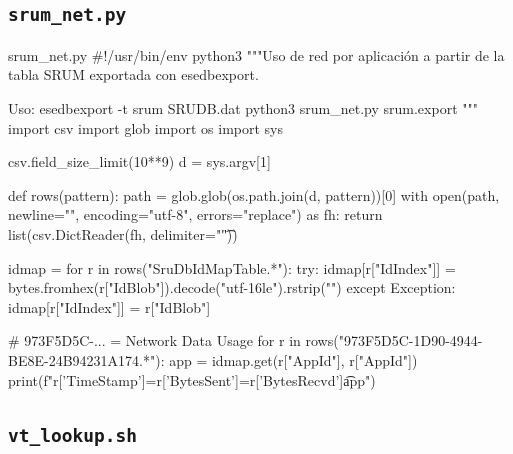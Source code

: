 \documentclass[11pt,a4paper]{article}
\begin{document}
\subsection{\texttt{srum\_net.py}}
\begin{codigopython}{srum\_net.py}
#!/usr/bin/env python3
"""Uso de red por aplicación a partir de la tabla SRUM exportada con esedbexport.

Uso:
  esedbexport -t srum SRUDB.dat
  python3 srum_net.py srum.export
"""
import csv
import glob
import os
import sys

csv.field_size_limit(10**9)
d = sys.argv[1]

def rows(pattern):
    path = glob.glob(os.path.join(d, pattern))[0]
    with open(path, newline="", encoding="utf-8", errors="replace") as fh:
        return list(csv.DictReader(fh, delimiter="\t"))

idmap = {}
for r in rows("SruDbIdMapTable.*"):
    try:
        idmap[r["IdIndex"]] = bytes.fromhex(r["IdBlob"]).decode("utf-16le").rstrip("")
    except Exception:
        idmap[r["IdIndex"]] = r["IdBlob"]

# {973F5D5C-...} = Network Data Usage
for r in rows("{973F5D5C-1D90-4944-BE8E-24B94231A174}.*"):
    app = idmap.get(r["AppId"], r["AppId"])
    print(f"{r['TimeStamp']}\tsent={r['BytesSent']}\trecv={r['BytesRecvd']}\t{app}")
\end{codigopython}

\subsection{\texttt{vt\_lookup.sh}}
\end{document}
